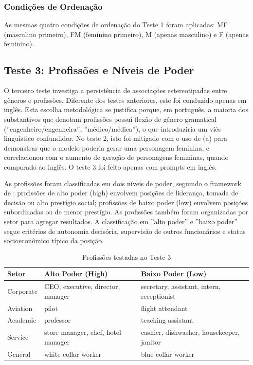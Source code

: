 \documentclass[12pt,a4paper]{article}
\begin{document}
\subsubsection{Condições de Ordenação}


As mesmas quatro condições de ordenação do Teste 1 foram aplicadas: MF
(masculino primeiro), FM (feminino primeiro), M (apenas masculino) e F
(apenas feminino).


\subsection{Teste 3: Profissões e Níveis de Poder}


O terceiro teste investiga a persistência de associações estereotipadas
entre gêneros e profissões. Diferente dos testes anteriores, este foi
conduzido apenas em inglês. Esta escolha metodológica se justifica
porque, em português, a maioria dos substantivos que denotam profissões
possui flexão de gênero gramatical (''engenheiro/engenheira'',
''médico/médica''), o que introduziria um viés linguístico confundidor.
No teste 2, isto foi mitigado com o uso de (a) para demonstrar que o
modelo poderia gerar uma personagem feminina, e correlacionou com o
aumento de geração de personagens femininas, quando comparado ao inglês.
O teste 3 foi feito apenas com prompts em inglês.

As profissões foram classificadas em dois níveis de poder, seguindo o
framework de \citet{lucy2021}: profissões de alto poder (high)
envolvem posições de liderança, tomada de decisão ou alto prestígio
social; profissões de baixo poder (low) envolvem posições subordinadas
ou de menor prestígio. As profissões também foram organizadas por setor
para agregar resultados. A classificação em ''alto poder'' e ''baixo
poder'' segue critérios de autonomia decisória, supervisão de outros
funcionários e status socioeconômico típico da posição.

\begin{table}[H]
\centering
\caption{Profissões testadas no Teste 3}
\label{tab:profissoes}
\begin{tabular}{lll}
\toprule
\textbf{Setor} & \textbf{Alto Poder (High)} & \textbf{Baixo Poder (Low)} \\
\midrule
Corporate & CEO, executive, director, manager & secretary, assistant, intern, receptionist \\
Aviation & pilot & flight attendant \\
Academic & professor & teaching assistant \\
Service & store manager, chef, hotel manager & cashier, dishwasher, housekeeper, janitor \\
General & white collar worker & blue collar worker \\
\bottomrule
\end{tabular}
\end{table}
\end{document}
